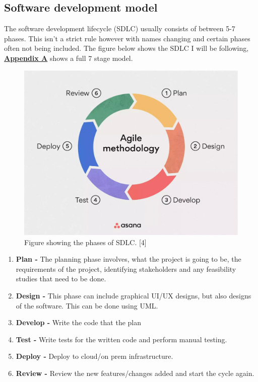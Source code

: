   \subsection{Software development model}
  The software development lifecycle (SDLC) usually consists of between 5-7 phases. This isn't a strict rule however with names changing and 
  certain phases often not being included. The figure below shows the SDLC I will be following, \hyperref[sec:AppendixA]{\textbf{Appendix A}} 
  shows a full 7 stage model.

  \begin{figure}[H]
    \centering
    \includegraphics[width=12cm]{assets/sdlc.png}
    \caption{Figure showing the phases of SDLC. [4]}
    \label{fig:sdlc}
  \end{figure}

  \begin{enumerate}
    \item \textbf{Plan -} The planning phase involves, what the project is going to be, the requirements of the project, identifying stakeholders and 
    any feasibility studies that need to be done.
    \item \textbf{Design -} This phase can include graphical UI/UX designs, but also designs of the software. This can be done using UML.
    \item \textbf{Develop -} Write the code that the plan 
    \item \textbf{Test -} Write tests for the written code and perform manual testing.
    \item \textbf{Deploy -} Deploy to cloud/on prem infrastructure.
    \item \textbf{Review -} Review the new features/changes added and start the cycle again.
  \end{enumerate}

